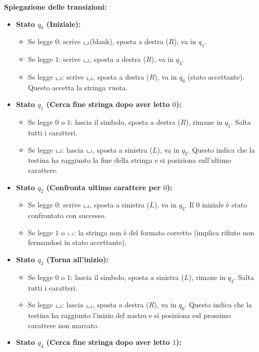 \documentclass[a4paper]{article}
\theoremstyle{definition} %
\newcommand{\blankS}{\ensuremath{\raisebox{-0.15ex}{\scalebox{1.3}[0.7]{$\sqcup$}}}}
\begin{document}
\vspace{0.5cm}
\noindent \textbf{Spiegazione delle transizioni:}
\begin{itemize}
    \item \textbf{Stato $q_0$ (Iniziale):}
    \begin{itemize}
        \item Se legge $0$: scrive \blankS (blank), sposta a destra ($R$), va in $q_1$.
        \item Se legge $1$: scrive \blankS, sposta a destra ($R$), va in $q_4$.
        \item Se legge \blankS: scrive \blankS, sposta a destra ($R$), va in $q_6$ (stato accettante). Questo accetta la stringa vuota.
    \end{itemize}
    \item \textbf{Stato $q_1$ (Cerca fine stringa dopo aver letto $0$):}
    \begin{itemize}
        \item Se legge $0$ o $1$: lascia il simbolo, sposta a destra ($R$), rimane in $q_1$. Salta tutti i caratteri.
        \item Se legge \blankS: lascia \blankS, sposta a sinistra ($L$), va in $q_2$. Questo indica che la testina ha raggiunto la fine della stringa e si posiziona sull'ultimo carattere.
    \end{itemize}
    \item \textbf{Stato $q_2$ (Confronta ultimo carattere per $0$):}
    \begin{itemize}
        \item Se legge $0$: scrive \blankS, sposta a sinistra ($L$), va in $q_3$. Il $0$ iniziale è stato confrontato con successo.
        \item Se legge $1$ o \blankS: la stringa non è del formato corretto (implica rifiuto non fermandosi in stato accettante).
    \end{itemize}
    \item \textbf{Stato $q_3$ (Torna all'inizio):}
    \begin{itemize}
        \item Se legge $0$ o $1$: lascia il simbolo, sposta a sinistra ($L$), rimane in $q_3$. Salta tutti i caratteri.
        \item Se legge \blankS: lascia \blankS, sposta a destra ($R$), va in $q_0$. Questo indica che la testina ha raggiunto l'inizio del nastro e si posiziona sul prossimo carattere non marcato.
    \end{itemize}
    \item \textbf{Stato $q_4$ (Cerca fine stringa dopo aver letto $1$):}

\end{itemize}
\end{document}
